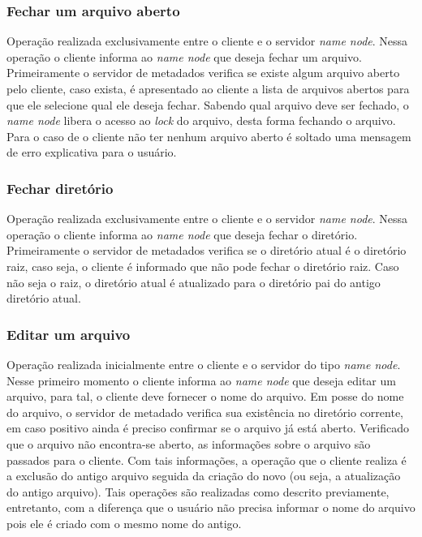 \subsubsection{Fechar um arquivo aberto}

Operação realizada exclusivamente entre o cliente e o servidor \textit{name node}. Nessa operação o cliente informa ao \textit{name node} que deseja fechar um arquivo. Primeiramente o servidor de metadados verifica se existe algum arquivo aberto pelo cliente, caso exista, é apresentado ao cliente a lista de arquivos abertos para que ele selecione qual ele deseja fechar. Sabendo qual arquivo deve ser fechado, o \textit{name node} libera o acesso ao \textit{lock} do arquivo, desta forma fechando o arquivo. Para o caso de o cliente não ter nenhum arquivo aberto é soltado uma mensagem de erro explicativa para o usuário.
\\

\subsubsection{Fechar diretório}

Operação realizada exclusivamente entre o cliente e o servidor \textit{name node}. Nessa operação o cliente informa ao \textit{name node} que deseja fechar o diretório. Primeiramente o servidor de metadados verifica se o diretório atual é o diretório raiz, caso seja, o cliente é informado que não pode fechar o diretório raiz. Caso não seja o raiz, o diretório atual é atualizado para o diretório pai do antigo diretório atual.
\\

\subsubsection{Editar um arquivo}

Operação realizada inicialmente entre o cliente e o servidor do tipo \textit{name node}. Nesse primeiro momento o cliente informa ao \textit{name node} que deseja editar um arquivo, para tal, o cliente deve fornecer o nome do arquivo. Em posse do nome do arquivo, o servidor de metadado verifica sua existência no diretório corrente, em caso positivo ainda é preciso confirmar se o arquivo já está aberto. Verificado que o arquivo não encontra-se aberto, as informações sobre o arquivo são passados para o cliente. Com tais informações, a operação que o cliente realiza é a exclusão do antigo arquivo seguida da criação do novo (ou seja, a atualização do antigo arquivo). Tais operações são realizadas como descrito previamente, entretanto, com a diferença que o usuário não precisa informar o nome do arquivo pois ele é criado com o mesmo nome do antigo.
\\


